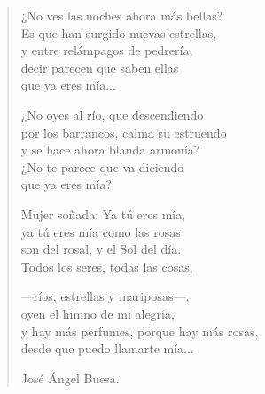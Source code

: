 \documentclass[11pt, portrait, twoside, notitlepage, openright]{book}
\begin{document}
\begin{verse}
¿No ves las noches ahora más bellas?\\
Es que han surgido nuevas estrellas,\\
y entre relámpagos de pedrería,\\
decir parecen que saben ellas\\
que ya eres mía...
\newline

¿No oyes al río, que descendiendo\\
por los barrancos, calma su estruendo\\
y se hace ahora blanda armonía?\\
¿No te parece que va diciendo\\
que ya eres mía?
\newpage

Mujer soñada: Ya tú eres mía,\\
ya tú eres mía como las rosas\\
son del rosal, y el Sol del día.\\
Todos los seres, todas las cosas,
\newline

—ríos, estrellas y mariposas—,\\
oyen el himno de mi alegría,\\
y hay más perfumes, porque hay más rosas,\\
desde que puedo llamarte mía...
\newline

José Ángel Buesa.
\end{verse}
\end{document}
